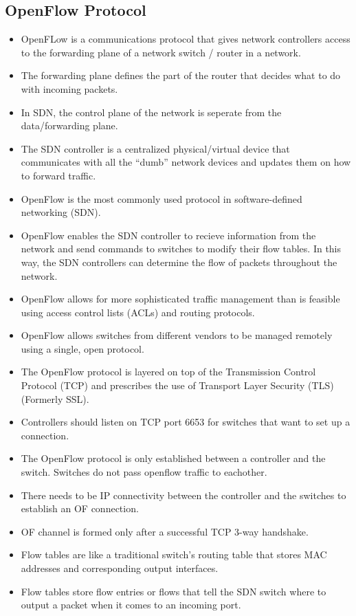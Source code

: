 \documentclass{article}
\begin{document}
\subsection{OpenFlow Protocol}
\begin{itemize}
    \item OpenFLow is a communications protocol that gives network controllers access to the forwarding plane of a network switch / router in a network.
    \item The forwarding plane defines the part of the router that decides what to do with incoming packets.
    \item In SDN, the control plane of the network is seperate from the data/forwarding plane.
    \item The SDN controller is a centralized physical/virtual device that communicates with all the “dumb” network devices and updates them on how to forward traffic. 
    \item OpenFlow is the most commonly used protocol in software-defined networking (SDN). 
    \item OpenFlow enables the SDN controller to recieve information from the network and send commands to switches to modify their flow tables. In this way, the SDN controllers can determine the flow of packets throughout the network.
    \item OpenFlow allows for more sophisticated traffic management than is feasible using access control lists (ACLs) and routing protocols. 
    \item OpenFlow allows switches from different vendors to be managed remotely using a single, open protocol. 
    \item The OpenFlow protocol is layered on top of the Transmission Control Protocol (TCP) and prescribes the use of Transport Layer Security (TLS) (Formerly SSL).
    \item Controllers should listen on TCP port 6653 for switches that want to set up a connection.
    \item The OpenFlow protocol is only established between a controller and the switch. Switches do not pass openflow traffic to eachother.
    \item There needs to be IP connectivity between the controller and the switches to establish an OF connection.
    \item OF channel is formed only after a successful TCP 3-way handshake.
    \item Flow tables are like a traditional switch’s routing table that stores MAC addresses and corresponding output interfaces.
    \item Flow tables store flow entries or flows that tell the SDN switch where to output a packet when it comes to an incoming port.
\end{itemize}
\end{document}
